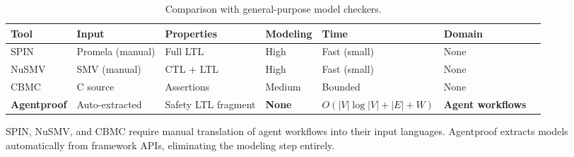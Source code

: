 \begin{table}[t]
\centering
\small
\caption{Comparison with general-purpose model checkers.}
\label{tab:comparison_mc}
\begin{tabular}{@{}lllllll@{}}
\toprule
\textbf{Tool} & \textbf{Input} & \textbf{Properties} & \textbf{Modeling} & \textbf{Time} & \textbf{Domain} \\
\midrule
SPIN & Promela (manual) & Full LTL & High & Fast (small) & None \\
NuSMV & SMV (manual) & CTL + LTL & High & Fast (small) & None \\
CBMC & C source & Assertions & Medium & Bounded & None \\
\textbf{Agentproof} & Auto-extracted & Safety LTL fragment & \textbf{None} & $O(|V|\log|V|{+}|E|{+}W)$ & \textbf{Agent workflows} \\
\bottomrule
\end{tabular}
\par\smallskip
\raggedright\footnotesize
SPIN, NuSMV, and CBMC require manual translation of agent workflows into their input languages. Agentproof extracts models automatically from framework APIs, eliminating the modeling step entirely.
\end{table}